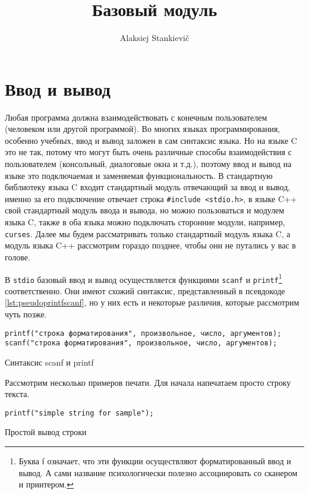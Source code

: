 \documentclass[12pt]{article}
\author{Alaksiej Stankievič}
\title{Базовый модуль}
\begin{document}

\section{Ввод и вывод}
Любая программа должна взаимодействовать с конечным пользователем (человеком или другой программой). Во многих языках программирования, особенно учебных, ввод и вывод заложен в сам синтаксис языка. Но на языке C это не так, потому что могут быть очень различные способы взаимодействия с пользователем (консольный, диалоговые окна и т.д.), поэтому ввод и вывод на языке это подключаемая и заменяемая функциональность. В стандартную библиотеку языка C входит стандартный модуль отвечающий за ввод и вывод, именно за его подключение отвечает строка \verb|#include <stdio.h>|, в языке C++ свой стандартный модуль ввода и вывода, но можно пользоваться и модулем языка C, также в оба языка можно подключать сторонние модули, например, \verb|curses|. Далее мы будем рассматривать только стандартный модуль языка C, а модуль языка C++ рассмотрим гораздо позднее, чтобы они не путались у вас в голове.

В \verb|stdio| базовый ввод и вывод осуществляется функциями \verb|scanf| и \verb|printf|\footnote{Буква f означает, что эти функции осуществляют форматированный ввод и вывод. А сами название психологически полезно ассоциировать со сканером и принтером.} соответственно. Они имеют схожий синтаксис, представленный в псевдокоде \ref{lst:pseudoprintfscanf}, но у них есть и некоторые различия, которые рассмотрим чуть позже.

\begin{listing}[ht]
\begin{center}
\begin{verbatim}
printf("строка форматирования", произвольное, число, аргументов);
scanf("строка форматирования", произвольное, число, аргументов);
\end{verbatim}
\end{center}
\caption{Синтаксис scanf и printf}
\label{lst:pseudoprintfscanf}
\end{listing}


Рассмотрим несколько примеров печати. Для начала напечатаем просто строку текста.

\begin{listing}[ht]
\begin{center}
\begin{verbatim}
printf("simple string for sample");
\end{verbatim}
\end{center}
\caption{Простой вывод строки}
\label{lst:simplestring}
\end{listing}
\end{document}
